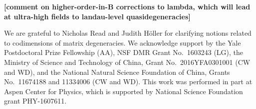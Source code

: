 \documentclass[aps, prb, showpacs, twocolumn, notitlepage, superscriptaddress]{revtex4-1}
\begin{document}

\textbf{[comment on higher-order-in-B corrections to lambda, which will lead at ultra-high fields to landau-level quasidegeneracies]}



\begin{acknowledgments}

We are grateful to Nicholas Read and Judith H\"oller for clarifying notions related to codimensions of matrix degeneracies. 
We acknowledge support by  the Yale Postdoctoral Prize Fellowship (AA), NSF DMR Grant No.\ 1603243 (LG),  the Ministry of Science and Technology of China, Grant No.\ 2016YFA0301001 (CW and WD), and the National Natural Science Foundation of China, Grants No.\ 11674188 and 11334006 (CW and WD). This work was performed in part at Aspen Center for Physics, which is supported by National Science Foundation grant PHY-1607611.
\end{acknowledgments}
\end{document}
